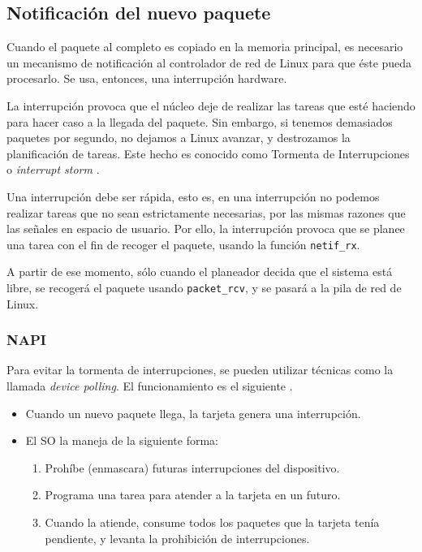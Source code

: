 \subsection{Notificación del nuevo paquete}
Cuando el paquete al completo es copiado en la memoria principal, es necesario un mecanismo de notificación al 
\gls{controlador} de red de Linux para que éste pueda procesarlo. Se usa, entonces, 
una interrupción hardware.

La interrupción provoca que el núcleo deje de realizar las tareas que esté haciendo para hacer caso a la llegada del 
paquete. Sin embargo, si tenemos demasiados paquetes por segundo, no dejamos a Linux avanzar, y destrozamos la 
planificación de tareas. Este hecho es conocido como Tormenta de Interrupciones o 
\emph{interrupt storm} \cite{p206}.

Una interrupción debe ser rápida, esto es, en una interrupción no podemos realizar tareas que no sean estrictamente 
necesarias, por las mismas razones que las señales en espacio de usuario. Por ello, la interrupción provoca que se 
planee una tarea con el fin de recoger el paquete, usando la función \texttt{netif\_rx}. 

A partir de ese momento, sólo cuando el planeador decida que el sistema está libre, se recogerá el paquete usando 
\texttt{packet\_rcv}, y se pasará a la pila de red de Linux.

\subsubsection{NAPI}
Para evitar la tormenta de interrupciones, se pueden utilizar técnicas como la llamada \emph{device polling}. El 
funcionamiento es el siguiente \cite{beyondDevicePolling}.
\begin{itemize}
 \item Cuando un nuevo paquete llega, la tarjeta genera una interrupción.
 \item El \gls{SO} la maneja de la siguiente forma:
 \begin{enumerate}
  \item Prohíbe (enmascara) futuras interrupciones del dispositivo.
  \item Programa una tarea para atender a la tarjeta en un futuro.
  \item Cuando la atiende, consume todos los paquetes que la tarjeta tenía pendiente, y levanta la prohibición de 
interrupciones.
 \end{enumerate}
\end{itemize}

